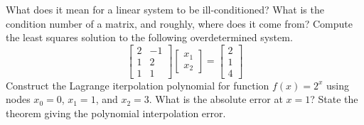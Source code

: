 \documentclass[addpoints, 11pt]{exam}
\begin{document}
\begin{questions}
\question What does it mean for a linear system to be ill-conditioned? What is the condition number of a matrix, and roughly, where does it come from?
\question Compute the least squares solution to the following overdetermined system.
$$
\left[
\begin{array}{cc}
2 & -1  \\
1 & 2 \\
1 & 1
\end{array}
\right] 
\left[
\begin{array}{c}
x_1 \\
x_2 
\end{array}
\right]
= \left[
\begin{array}{c}
2 \\ 
1 \\
4
\end{array}
\right]
$$
\question Construct the Lagrange iterpolation polynomial for function $f(x) = 2^x$ using nodes $x_0=0$, $x_1=1$, and $x_2=3$. What is the absolute error at $x=1$?
\question State the theorem giving the polynomial interpolation error.
\end{questions}
\end{document}
